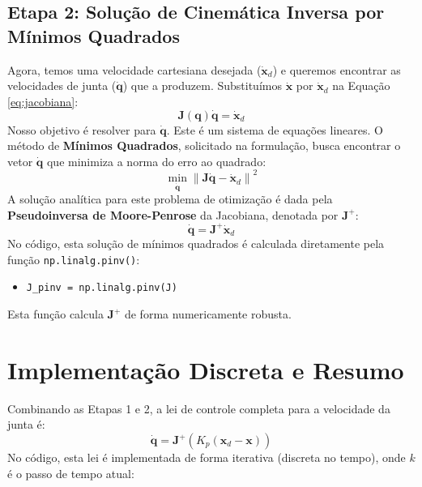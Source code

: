 \documentclass[a4paper, 12pt]{article}
\begin{document}
\subsection{Etapa 2: Solução de Cinemática Inversa por Mínimos Quadrados}
Agora, temos uma velocidade cartesiana desejada ($\dot{\mathbf{x}}_d$) e queremos encontrar as velocidades de junta ($\dot{\mathbf{q}}$) que a produzem. Substituímos $\dot{\mathbf{x}}$ por $\dot{\mathbf{x}}_d$ na Equação \eqref{eq:jacobiana}:
\[
\mathbf{J}(\mathbf{q}) \dot{\mathbf{q}} = \dot{\mathbf{x}}_d
\]
Nosso objetivo é resolver para $\dot{\mathbf{q}}$. Este é um sistema de equações lineares. O método de \textbf{Mínimos Quadrados}, solicitado na formulação, busca encontrar o vetor $\dot{\mathbf{q}}$ que minimiza a norma do erro ao quadrado:
\begin{equation}
\min_{\dot{\mathbf{q}}} \left\| \mathbf{J}\dot{\mathbf{q}} - \dot{\mathbf{x}}_d \right\|^2
\label{eq:least_squares}
\end{equation}
A solução analítica para este problema de otimização é dada pela \textbf{Pseudoinversa de Moore-Penrose} da Jacobiana, denotada por $\mathbf{J}^+$:
\begin{equation}
\dot{\mathbf{q}} = \mathbf{J}^+ \dot{\mathbf{x}}_d
\label{eq:pseudoinverse}
\end{equation}
No código, esta solução de mínimos quadrados é calculada diretamente pela função \texttt{np.linalg.pinv()}:
\begin{itemize}
    \item \texttt{J\_pinv = np.linalg.pinv(J)}
\end{itemize}
Esta função calcula $\mathbf{J}^+$ de forma numericamente robusta.

\section{Implementação Discreta e Resumo}
Combinando as Etapas 1 e 2, a lei de controle completa para a velocidade da junta é:
\[
\dot{\mathbf{q}} = \mathbf{J}^+ (K_p (\mathbf{x}_d - \mathbf{x}))
\]
No código, esta lei é implementada de forma iterativa (discreta no tempo), onde $k$ é o passo de tempo atual:
\end{document}
